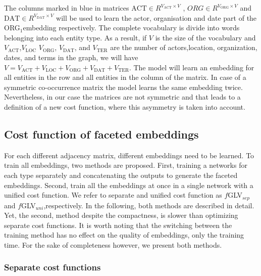 The columns marked in blue in matrices $\mathrm{ACT}\in R^{V_{\mathrm{ACT}}\times V}$ , $ORG\in R^{V_{\mathrm{ORG}}\times V}$  and $\mathrm{DAT}\in R^{V_{\mathrm{\mathrm{DAT}}}\times V}$ will be used to learn the actor, organisation and date part of the ORG$_1$embedding respectively. The complete vocabulary is divide into words belonging into each entity type. As a result, if $V$ is the size of the vocabulary and $V_{\mathrm{ACT}}$,$V_{\mathrm{LOC}}$ $V_{\mathrm{ORG}}$, $V_{\mathrm{DAT}}$, and $V_{\mathrm{TER}}$  are the number of actors,location, organization, dates, and terms in the graph, we will have $V=V_{\mathrm{ACT}}+V_{\mathrm{LOC}}+V_{\mathrm{ORG}}+V_{\mathrm{DAT}}+V_{\mathrm{TER}}$. The model will learn an embedding for all entities in the row and all entities in the column of the matrix. In case of a symmetric co-occurrence matrix the model learns the same embedding twice. Nevertheless, in our case the matrices are not symmetric and that leads to a definition of a new cost function, where this asymmetry is taken into account.  
\subsection{Cost function of faceted embeddings}
\label{sec:faceted_embeddings}
For each different adjacency matrix, different embeddings need to be learned. To train all embeddings, two methods are proposed. First, training a networks for each type separately and concatenating the outputs to generate the faceted embeddings. Second, train all the embeddings at once in a single network with a unified cost function. We refer to separate and unified cost function as $f$GLV$_{sep}$ and $f$GLV$_{uni}$,respectively. In the following, both methods are described in detail. Yet, the second, method despite the compactness, is slower than optimizing separate cost functions. It is worth noting that the switching between the training method has no effect on the quality of embeddings, only the training time. For the sake of completeness however, we present both methods. \\
\subsubsection{Separate cost functions}
\label{sec:normal_cost}

